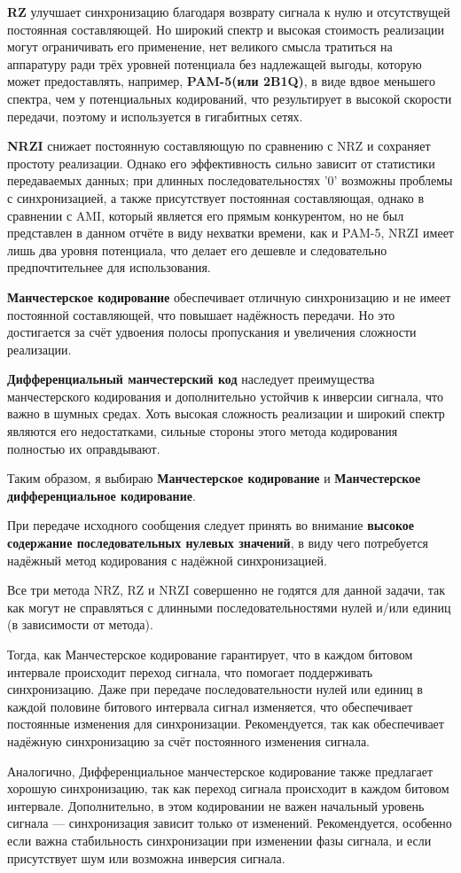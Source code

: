 \textbf{RZ} улучшает синхронизацию благодаря возврату сигнала к нулю и отсутствущей постоянная составляющей. Но широкий спектр и высокая стоимость реализации могут ограничивать его применение, нет великого смысла тратиться на аппаратуру ради трёх уровней потенциала без надлежащей выгоды, которую может предоставлять, например, \textbf{PAM-5(или 2B1Q)}, в виде вдвое меньшего спектра, чем у потенциальных кодирований, что результирует в высокой скорости передачи, поэтому и используется в гигабитных сетях.

\textbf{NRZI} снижает постоянную составляющую по сравнению с NRZ и сохраняет простоту реализации. Однако его эффективность сильно зависит от статистики передаваемых данных; при длинных последовательностях '0' возможны проблемы с синхронизацией, а также присутствует постоянная составляющая, однако в сравнении с AMI, который является его прямым конкурентом, но не был представлен в данном отчёте в виду нехватки времени, как и PAM-5, NRZI имеет лишь два уровня потенциала, что делает его дешевле и следовательно предпочтительнее для использования.

\textbf{Манчестерское кодирование} обеспечивает отличную синхронизацию и не имеет постоянной составляющей, что повышает надёжность передачи. Но это достигается за счёт удвоения полосы пропускания и увеличения сложности реализации.

\textbf{Дифференциальный манчестерский код} наследует преимущества манчестерского кодирования и дополнительно устойчив к инверсии сигнала, что важно в шумных средах. Хоть высокая сложность реализации и широкий спектр являются его недостатками, сильные стороны этого метода кодирования полностью их оправдывают.

Таким образом, я выбираю \textbf{Манчестерское кодирование} и \textbf{Манчестерское дифференциальное кодирование}.

При передаче исходного сообщения следует принять во внимание \textbf{высокое содержание последовательных нулевых значений}, в виду чего потребуется надёжный метод кодирования с надёжной синхронизацией.

Все три метода NRZ, RZ и NRZI совершенно не годятся для данной задачи, так как могут не справляться с длинными последовательностями нулей и/или единиц (в зависимости от метода).

Тогда, как Манчестерское кодирование гарантирует, что в каждом битовом интервале происходит переход сигнала, что помогает поддерживать синхронизацию. Даже при передаче последовательности нулей или единиц в каждой половине битового интервала сигнал изменяется, что обеспечивает постоянные изменения для синхронизации. Рекомендуется, так как обеспечивает надёжную синхронизацию за счёт постоянного изменения сигнала.

Аналогично, Дифференциальное манчестерское кодирование также предлагает хорошую синхронизацию, так как переход сигнала происходит в каждом битовом интервале. Дополнительно, в этом кодировании не важен начальный уровень сигнала — синхронизация зависит только от изменений. Рекомендуется, особенно если важна стабильность синхронизации при изменении фазы сигнала, и если присутствует шум или возможна инверсия сигнала.

